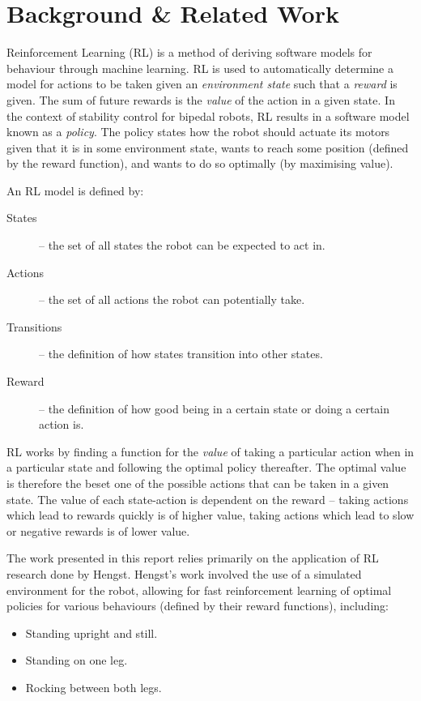 \newpage
\section{Background \& Related Work}

Reinforcement Learning (RL) is a method of deriving software models for behaviour through machine learning. RL is used to automatically determine a model for actions to be taken given an \textit{environment state} such that a \textit{reward} is given. The sum of future rewards is the \textit{value} of the action in a given state. In the context of stability control for bipedal robots, RL results in a software model known as a \textit{policy}. The policy states how the robot should actuate its motors given that it is in some environment state, wants to reach some position (defined by the reward function), and wants to do so optimally (by maximising value).

An RL model is defined by:\cite{bernhard_rl}

\begin{description}
\item[States] -- the set of all states the robot can be expected to act in.
\item[Actions] -- the set of all actions the robot can potentially take.
\item[Transitions] -- the definition of how states transition into other states.
\item[Reward] -- the definition of how good being in a certain state or doing a certain action is.
\end{description}

RL works by finding a function for the \textit{value} of taking a particular action when in a particular state and following the optimal policy thereafter. The optimal value is therefore the beset one of the possible actions that can be taken in a given state. The value of each state-action is dependent on the reward -- taking actions which lead to rewards quickly is of higher value, taking actions which lead to slow or negative rewards is of lower value.

The work presented in this report relies primarily on the application of RL research done by Hengst\cite{bernhard_rl}. Hengst's work involved the use of a simulated environment for the robot, allowing for fast reinforcement learning of optimal policies for various behaviours (defined by their reward functions), including:

\begin{itemize}
\item Standing upright and still.
\item Standing on one leg.
\item Rocking between both legs.
\end{itemize}

